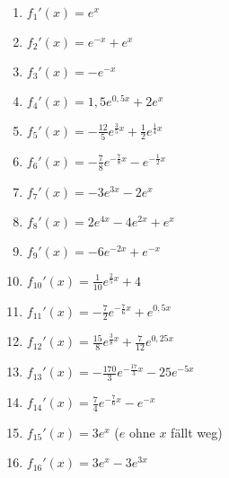 \begin{Answer}[ref=summenregelA1]\\
	\begin{minipage}{\textwidth}
		\begin{minipage}{0.5\textwidth}
			\begin{enumerate}[label=\alph*)]
				\item \(f_1'(x)=e^x\)
				\item \(f_2'(x)=e^{-x}+e^x\)
				\item \(f_3'(x)=-e^{-x}\)
				\item \(f_4'(x)=1,5e^{0,5x}+2e^x\)
				\item \(f_5'(x)=-\frac{12}{5}e^{\frac{3}{5}x}+\frac{1}{2}e^{\frac{1}{4}x}\)
				\item \(f_6'(x)=-\frac{7}{8}e^{-\frac{7}{8}x}-e^{-\frac{1}{2}x}\)
				\item \(f_7'(x)=-3e^{3x}-2e^{x}\)
				\item \(f_8'(x)=2e^{4x}-4e^{2x}+e^x\)
			\end{enumerate}
		\end{minipage}
		\begin{minipage}{0.5\textwidth}
			\begin{enumerate}[label=\alph*)]
				\setcounter{enumi}{8}
				\item \(f_9'(x)=-6e^{-2x}+e^{-x}\)
				\item \(f_{10}'(x)=\frac{1}{10}e^{\frac{2}{5}x}+4\)
				\item \(f_{11}'(x)=-\frac{7}{2}e^{-\frac{7}{6}x}+e^{0,5x}\)
				\item \(f_{12}'(x)=\frac{15}{8}e^{\frac{3}{8}x}+\frac{7}{12}e^{0,25x}\)
				\item \(f_{13}'(x)=-\frac{170}{3}e^{-\frac{17}{3}x}-25e^{-5x}\)
				\item \(f_{14}'(x)=\frac{7}{4}e^{-\frac{7}{6}x}-e^{-x}\)
				\item \(f_{15}'(x)=3e^x\) (\(e\) ohne \(x\) fällt weg)
				\item \(f_{16}'(x)=3e^x-3e^{3x}\)
			\end{enumerate}
		\end{minipage}
	\end{minipage}\\  \\
\end{Answer}